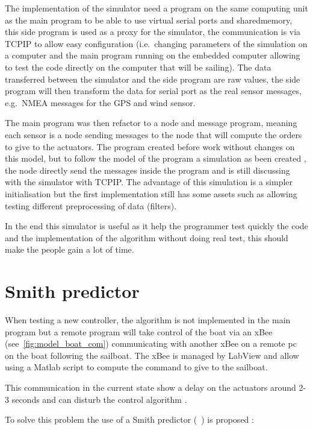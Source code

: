 The implementation of the simulator need a program on the same computing unit as the main program to be able to use virtual serial ports and \gls{sharedmemory}, this side program is used as a proxy for the simulator, the communication is via \gls{TCPIP} to allow easy configuration (i.e.\ changing parameters of the simulation on a computer and the main program running on the embedded computer allowing to test the code directly on the computer that will be sailing).
The data transferred between the simulator and the side program are raw values, the side program will 
then transform the data for serial port as the real sensor messages, e.g.\ \gls{NMEA} messages for the GPS and 
wind sensor.

The main program was then refactor to a node and message program, meaning each sensor is a node sending messages to the node that will compute the orders to give to the actuators. The program created before work without changes on this model, but to follow the model of the program a simulation as been created , the node directly send the messages inside the program and is still discussing with the simulator with \gls{TCPIP}.
The advantage of this simulation is a simpler initialisation but the first implementation still has some assets such as allowing testing different preprocessing of data (filters).

In the end this simulator is useful as it help the programmer test quickly the code and the implementation of the algorithm without doing real test, this should make the people gain a lot of time.



\section{Smith predictor}

When testing a new controller, the algorithm is not implemented in the main program but a remote program will take control of the boat via an xBee (see~\ref{fig:model_boat_com}) communicating with another xBee on a remote pc on the boat following the sailboat. The xBee is managed by LabView and allow using a Matlab script to compute the command to give to the sailboat.

This communication in the current state show a delay on the actuators around 2-3 seconds and can disturb the control algorithm .

To solve this problem the use of a Smith predictor (~\cite{smith1959controller}) is proposed :

